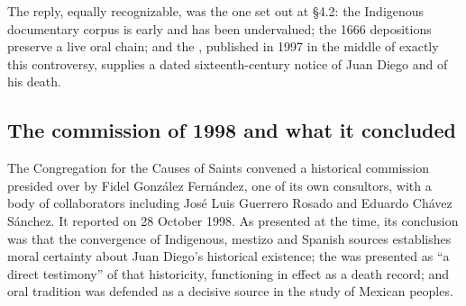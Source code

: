 The reply, equally recognizable, was the one set out at \S4.2: the
Indigenous documentary corpus is early and has been undervalued; the
1666 depositions preserve a live oral chain; and the
, published in 1997 in the middle of exactly
this controversy, supplies a dated sixteenth-century notice of Juan
Diego and of his death.

\subsection{The commission of 1998 and what it concluded}

The Congregation for the Causes of Saints convened a historical
commission presided over by Fidel Gonz\'alez Fern\'andez, one of its
own consultors, with a body of collaborators including Jos\'e Luis
Guerrero Rosado and Eduardo Ch\'avez S\'anchez. It reported on 28
October 1998. As presented at the time, its conclusion was that the
convergence of Indigenous, mestizo and Spanish sources establishes
moral certainty about Juan Diego's historical existence; the
 was presented as ``a direct testimony'' of
that historicity, functioning in effect as a death record; and oral
tradition was defended as a decisive source in the study of Mexican
peoples.

